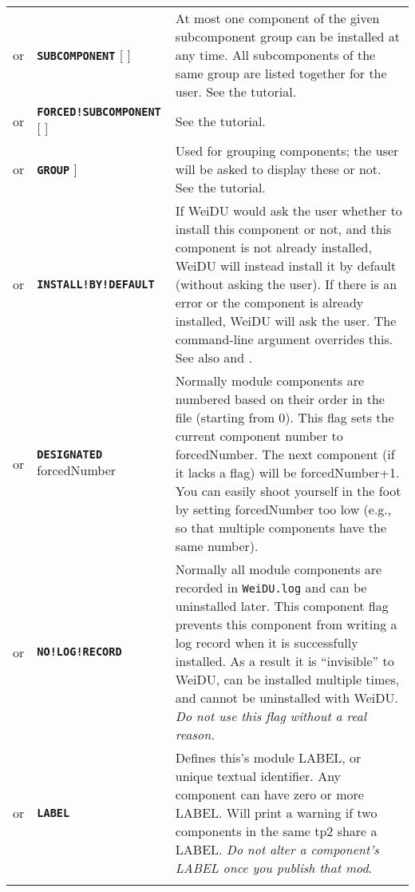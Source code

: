 \documentclass{article}
\def\ttref#1{\ahrefloc{#1}{\tt #1}}
\def\DEFINE#1{{\tt \bf #1}\label{#1}\index{#1}}
\def\DEFSYN#1{{\tt \bf #1}\index{#1}}
\def\t#1{{\tt #1}}
\def\Ob{{\color{red} [ }}
\def\Oe{{\color{red} ] }}
\begin{document}
\begin{tabular}{cp{10in}|p{10in}}
  or & \DEFSYN{SUBCOMPONENT} \ttref{String} \Ob \ttref{value} \Oe &
      At most one component of the given subcomponent group can be
      installed at any time. All subcomponents of the same group are
      listed together for the user. See the \ttref{SUBCOMPONENT}
      tutorial. \\

  or & \DEFINE{FORCED!SUBCOMPONENT} \ttref{String} \Ob \ttref{value} \Oe &
      See the \ttref{SUBCOMPONENT} tutorial. \\
  
  or & \DEFSYN{GROUP} \ttref{String}\Ob \ttref{value} \Oe & Used for grouping components; the user
      will be asked to display these or not. See the \ttref{GROUP} tutorial. \\

  or & \DEFINE{INSTALL!BY!DEFAULT} &
      If WeiDU would ask the user whether to install this component or not,
      and this component is not already installed, WeiDU will instead
      install it by default (without asking the user). If there is an error
      or the component is already installed, WeiDU will ask the user. The
      \ttref{--uninstall} command-line argument overrides this. See also
      \ttref{REQUIRE!COMPONENT} and \ttref{ALWAYS}.  \\

  or & \DEFINE{DESIGNATED} forcedNumber &
      Normally module components are numbered based on their order in the
      \ttref{TP2} file (starting from 0). This flag sets the current
      component number to forcedNumber. The next component (if it lacks a
      \ttref{DESIGNATED} flag) will be forcedNumber+1. You can easily shoot
      yourself in the foot by setting forcedNumber too low (e.g., so that
      multiple components have the same number). \\

  or & \DEFINE{NO!LOG!RECORD} &
      Normally all module components are recorded in \t{WeiDU.log} and can
      be uninstalled later. This component flag prevents this component
      from writing a log record when it is successfully installed. As a
      result it is ``invisible'' to WeiDU, can be installed multiple times,
      and cannot be uninstalled with WeiDU. \emph{Do not use this flag without
	  a real reason.} \\
  or & \DEFINE{LABEL} \ttref{String} &
      Defines this's module LABEL, or unique textual identifier. Any component
	  can have zero or more LABEL. Will print a warning if two components in
      the same tp2 share a LABEL. \emph{Do not alter a component's LABEL once
	  you publish that mod}. \\
\\


\end{tabular}
\end{document}
